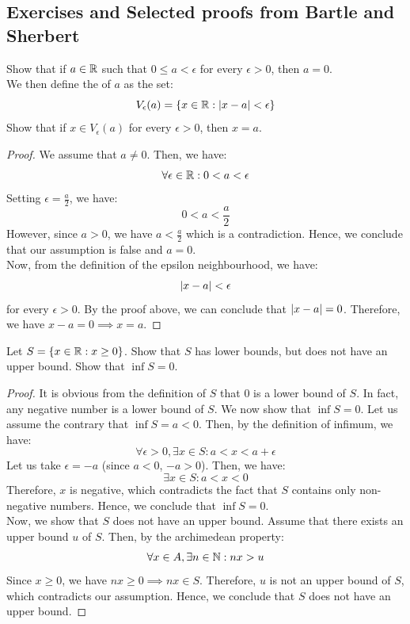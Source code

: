 \documentclass[openany]{book}
\begin{document}
\subsection{Exercises and Selected proofs from Bartle and Sherbert}
\begin{exercise}
    Show that if $a \in \mathbb{R}$ such that $0 \leq a < \epsilon$ for every $\epsilon > 0$, then $a = 0$. \\
    We then define the  of $a$ as the set:
    $$V_\epsilon(a) = \{x \in \mathbb{R}: |x - a| < \epsilon\}$$
    Show that if $ x \in V_\epsilon(a)$ for every $\epsilon > 0$, then $x = a$.
\end{exercise}
\begin{proof}
    We assume that $a \neq 0$. Then, we have:
    $$\forall \epsilon \in \mathbb{R}: 0 < a < \epsilon$$
    Setting $\epsilon = \frac{a}{2}$, we have:
    $$0 < a < \frac{a}{2}$$
    However, since $a > 0$, we have $a < \frac{a}{2}$ which is a contradiction. Hence, we conclude that our assumption is false and $a = 0$. \\
    Now, from the definition of the epsilon neighbourhood, we have:
    $$\left| x-a \right| < \epsilon$$
    for every $\epsilon > 0$. By the proof above, we can conclude that $\left| x-a \right| = 0$. Therefore, we have $x - a = 0 \implies x = a$. 
\end{proof}
\begin{exercise}
    Let $S = \{x \in \mathbb{R}: x \geq 0\}$. Show that $S$ has lower bounds, but does not have an upper bound. Show that $\inf S = 0$.  
\end{exercise}
\begin{proof}
    It is obvious from the definition of $S$ that 0 is a lower bound of $S$. In fact, any negative number is a lower bound of $S$. We now show that $\inf S = 0$. Let us assume the contrary that $\inf S = a < 0$. Then, by the definition of infimum, we have: 
    $$\forall \epsilon > 0, \exists x \in S: a < x < a + \epsilon$$
    Let us take $\epsilon = -a$ (since $a < 0$, $-a > 0$). Then, we have: 
    $$\exists x \in S: a < x < 0$$
    Therefore, $x$ is negative, which contradicts the fact that $S$ contains only non-negative numbers. Hence, we conclude that $\inf S = 0$. \\
    Now, we show that $S$ does not have an upper bound. Assume that there exists an upper bound $u$ of $S$. Then, by the archimedean property: 
    $$\forall x \in A, \exists n \in \mathbb{N}: nx > u$$ 
    Since $x \geq 0$, we have $nx \geq 0 \implies nx \in S$. Therefore, $u$ is not an upper bound of $S$, which contradicts our assumption. Hence, we conclude that $S$ does not have an upper bound.
\end{proof}
\end{document}
